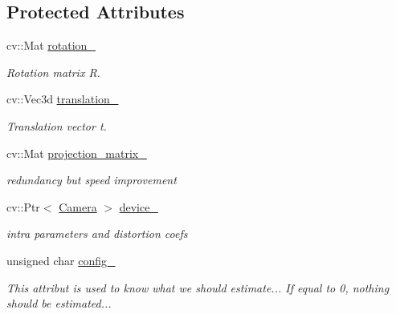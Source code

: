 \subsection*{Protected Attributes}
\begin{DoxyCompactItemize}
\item 
\hypertarget{class_opencv_sf_m_1_1_point_of_view_a4593900dcb330a47fdb5a7a1c4e2ad93}{
cv::Mat \hyperlink{class_opencv_sf_m_1_1_point_of_view_a4593900dcb330a47fdb5a7a1c4e2ad93}{rotation\_\-}}
\label{class_opencv_sf_m_1_1_point_of_view_a4593900dcb330a47fdb5a7a1c4e2ad93}

\begin{DoxyCompactList}\small\item\em Rotation matrix R. \end{DoxyCompactList}\item 
\hypertarget{class_opencv_sf_m_1_1_point_of_view_a9ffbc9dc46273ab30f752c303b5c9848}{
cv::Vec3d \hyperlink{class_opencv_sf_m_1_1_point_of_view_a9ffbc9dc46273ab30f752c303b5c9848}{translation\_\-}}
\label{class_opencv_sf_m_1_1_point_of_view_a9ffbc9dc46273ab30f752c303b5c9848}

\begin{DoxyCompactList}\small\item\em Translation vector t. \end{DoxyCompactList}\item 
\hypertarget{class_opencv_sf_m_1_1_point_of_view_a920f9386c300582a19e68908654d169c}{
cv::Mat \hyperlink{class_opencv_sf_m_1_1_point_of_view_a920f9386c300582a19e68908654d169c}{projection\_\-matrix\_\-}}
\label{class_opencv_sf_m_1_1_point_of_view_a920f9386c300582a19e68908654d169c}

\begin{DoxyCompactList}\small\item\em redundancy but speed improvement \end{DoxyCompactList}\item 
\hypertarget{class_opencv_sf_m_1_1_point_of_view_a83bfd58fd1074d5950dad2be9630dbf8}{
cv::Ptr$<$ \hyperlink{class_opencv_sf_m_1_1_camera}{Camera} $>$ \hyperlink{class_opencv_sf_m_1_1_point_of_view_a83bfd58fd1074d5950dad2be9630dbf8}{device\_\-}}
\label{class_opencv_sf_m_1_1_point_of_view_a83bfd58fd1074d5950dad2be9630dbf8}

\begin{DoxyCompactList}\small\item\em intra parameters and distortion coefs \end{DoxyCompactList}\item 
\hypertarget{class_opencv_sf_m_1_1_point_of_view_ac644fc5f92709b33a31ee2370365f104}{
unsigned char \hyperlink{class_opencv_sf_m_1_1_point_of_view_ac644fc5f92709b33a31ee2370365f104}{config\_\-}}
\label{class_opencv_sf_m_1_1_point_of_view_ac644fc5f92709b33a31ee2370365f104}

\begin{DoxyCompactList}\small\item\em This attribut is used to know what we should estimate... If equal to 0, nothing should be estimated... \end{DoxyCompactList}\end{DoxyCompactItemize}



